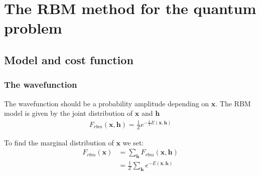 \documentclass[twoside,english]{uiofysmaster}
\newcommand{\Vx}{\mathbf{x}}
\begin{document}
\begin{comment}
		\begin{itemize}
			\item 2008 Nair, Hinton: Implicit mixtures of restricted boltzmann machine
		\end{itemize}
		\item This is a much better way of implementing an exponentially large mixture of linear models with shared latent variables than the method described in
		\begin{itemize}
			\item 1999 Hinton, Sallanes, Ghahramani: A hierarchical community of experts
		\end{itemize}
		 which uses directed linear models as the components of the mixture and a separate sig- moid belief net to decide which hidden units should be part of the current linear model. In that model, it is hard to infer the values of the binary latent variables and there can be jumps in density at the boundary be- tween two linear regions. A big advantage of switch- ing between linear models at the point where a hidden unit receives an input of exactly zero is that it avoids discontinuities in the modeled probability density.
	\end{itemize}
\end{itemize}
\end{comment}





\chapter{The RBM method for the quantum problem}
\section{Model and cost function}
\subsection{The wavefunction}
The wavefunction should be a probability amplitude depending on $\bm{x}$. The RBM model is given by the joint distribution of $\bm{x}$ and $\bm{h}$
\begin{align}
	F_{rbm}(\Vx,\mathbf{h}) = \frac{1}{Z} e^{-\frac{1}{T}E(\Vx,\mathbf{h})}
\end{align}

To find the marginal distribution of $\bm{x}$ we set:
\begin{align}
	F_{rbm}(\mathbf{x}) &= \sum_\mathbf{h} F_{rbm}(\mathbf{x}, \mathbf{h}) \\
				&= \frac{1}{Z}\sum_\mathbf{h} e^{-E(\mathbf{x}, \mathbf{h})}
\end{align}
\end{document}
